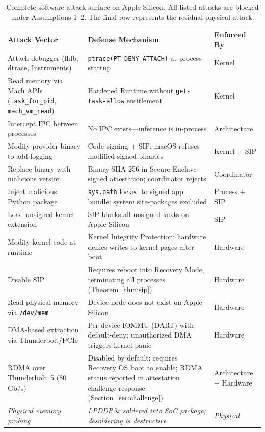 \documentclass[10pt,twocolumn,letterpaper]{article}
\begin{document}
\begin{table}[t]
\centering
\caption{Complete software attack surface on Apple Silicon. All listed attacks are blocked under Assumptions 1--2. The final row represents the residual physical attack.}
\label{tab:attacks}
\vspace{4pt}
\small
\begin{tabularx}{\textwidth}{@{}lXl@{}}
\toprule
\textbf{Attack Vector} & \textbf{Defense Mechanism} & \textbf{Enforced By} \\
\midrule
Attach debugger (lldb, dtrace, Instruments) & \texttt{ptrace(PT\_DENY\_ATTACH)} at process startup & Kernel \\
Read memory via Mach APIs (\texttt{task\_for\_pid}, \texttt{mach\_vm\_read}) & Hardened Runtime without \texttt{get-task-allow} entitlement & Kernel \\
Intercept IPC between processes & No IPC exists---inference is in-process & Architecture \\
Modify provider binary to add logging & Code signing + SIP: macOS refuses modified signed binaries & Kernel + SIP \\
Replace binary with malicious version & Binary SHA-256 in Secure Enclave-signed attestation; coordinator rejects & Coordinator \\
Inject malicious Python package & \texttt{sys.path} locked to signed app bundle; system site-packages excluded & Process + SIP \\
Load unsigned kernel extension & SIP blocks all unsigned kexts on Apple Silicon & SIP \\
Modify kernel code at runtime & Kernel Integrity Protection: hardware denies writes to kernel pages after boot & Hardware \\
Disable SIP & Requires reboot into Recovery Mode, terminating all processes (Theorem~\ref{thm:sip}) & Hardware \\
Read physical memory via \texttt{/dev/mem} & Device node does not exist on Apple Silicon & Hardware \\
DMA-based extraction via Thunderbolt/PCIe & Per-device IOMMU (DART) with default-deny; unauthorized DMA triggers kernel panic & Hardware \\
RDMA over Thunderbolt~5 (80\,Gb/s) & Disabled by default; requires Recovery OS boot to enable; RDMA status reported in attestation challenge-response (Section~\ref{sec:challenge}) & Architecture + Hardware \\
\midrule
\textit{Physical memory probing} & \textit{LPDDR5x soldered into SoC package; desoldering is destructive} & \textit{Physical} \\
\bottomrule
\end{tabularx}
\end{table}
\end{document}
